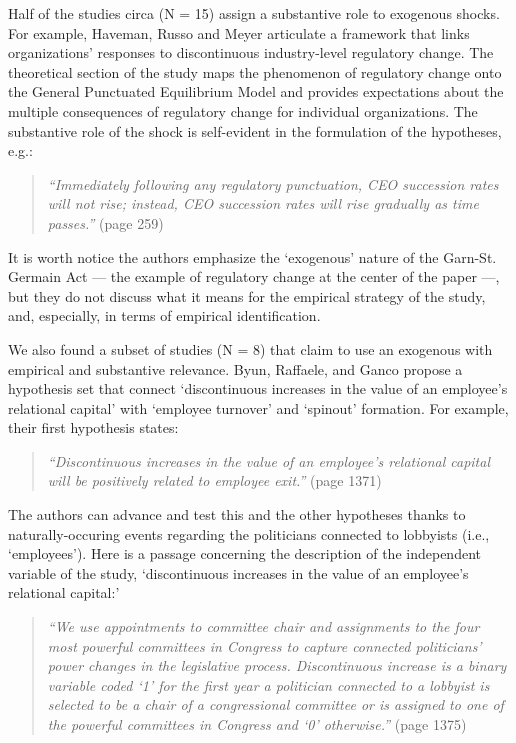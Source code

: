\documentclass[11pt]{article}
\begin{document}
\begin{refsection}
Half of the studies circa (N = 15) assign a substantive role to exogenous
shocks.  For example, Haveman, Russo and Meyer \autocite*{haveman2001253} 
articulate a framework that links organizations' responses to discontinuous
industry-level regulatory change. The theoretical section of the study maps the
phenomenon of regulatory change onto the General Punctuated Equilibrium Model
and provides expectations about the multiple consequences of regulatory change
for individual organizations. The substantive role of the shock is self-evident
in the formulation of the hypotheses, e.g.:

\begin{quote}
  \textit{
    ``Immediately following any regulatory punctuation, CEO succession rates
    will not rise; instead, CEO succession rates will rise gradually as time
    passes.''
  }
  (page 259)
\end{quote}

It is worth notice the authors emphasize the `exogenous' nature of the Garn-St.
Germain Act --- the example of regulatory change at the center of the paper 
---, but they do not discuss what it means for the empirical strategy of 
the study, and, especially, in terms of empirical identification.

We also found a subset of studies (N = 8) that claim to use an exogenous with
empirical and substantive relevance. Byun, Raffaele, and Ganco
\autocite{byun20191368} propose a hypothesis set that connect `discontinuous
increases in the value of an employee's relational capital' with `employee
turnover' and `spinout' formation. For example, their first hypothesis states:

\begin{quote}
  \textit{
    ``Discontinuous increases in the value of an  employee's relational capital 
    will be positively related to employee exit.''
  }
  (page 1371)
\end{quote}

The authors can advance and test this and the other hypotheses thanks to
naturally-occuring events regarding the politicians connected to lobbyists
(i.e., `employees').  Here is a passage concerning the description of the
independent variable of the study, `discontinuous increases in the value of an
employee's relational capital:'

\begin{quote}
  \textit{
    ``We use appointments to committee chair and assignments to the four most
    powerful committees in Congress to capture connected politicians' power
    changes in the legislative process. Discontinuous increase is a binary
    variable coded `1' for the first year a politician connected to a lobbyist is
    selected to be a chair of a congressional committee or is assigned to one of
    the powerful committees in Congress and `0' otherwise.''
  }
  (page 1375)
\end{quote}


\end{refsection}
\end{document}

